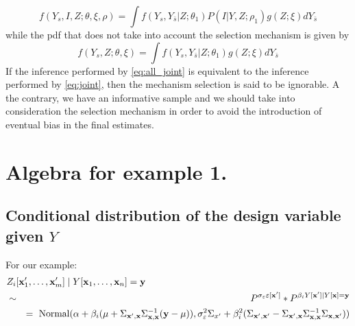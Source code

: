 \documentclass[12pt]{article}
\theoremstyle{definition}
\theoremstyle{remark}
\newcommand{\paramnuisance}{\xi}
\newcommand{\provar}{\Sigma}
\newcommand{\position}{\mathbf{x}}
\newcommand{\Signal}{Y}
\newcommand{\signal}{\mathbf{y}}
\newcommand{\indicator}{I}
\newcommand{\Desvar}{Z}
\begin{document}
\begin{equation} \label{eq:all_joint}
    f\left(\Signal_{s},\indicator,\Desvar;\theta,\paramnuisance,\rho\right)=\int{f\left(\Signal_{s},\Signal_{\bar{s}}|\Desvar;\theta_{1}\right)P\left(\indicator|\Signal,\Desvar;\rho_{1}\right)g\left(\Desvar;\paramnuisance\right)d\Signal_{\bar{s}}}
\end{equation}
while the pdf that does not take into account the selection mechanism is given by
\begin{equation} \label{eq:joint}
    f\left(\Signal_{s},\Desvar;\theta,\paramnuisance\right)=\int{f\left(\Signal_{s},\Signal_{\bar{s}}|\Desvar;\theta_{1}\right)g\left(\Desvar;\paramnuisance\right)d\Signal_{\bar{s}}}
\end{equation}
If the inference performed by \eqref{eq:all_joint} is equivalent to the inference performed by \eqref{eq:joint}, then the mechanism selection is said to be ignorable. A the contrary, we have an informative sample and we should take into consideration the selection mechanism in order to avoid the introduction of eventual bias in the final estimates.




\appendix
\section{Algebra for example 1.}

\subsection{Conditional distribution of the design variable given $\Signal$}
For our example:
\begin{eqnarray*}
\lefteqn{\Desvar_i[\position'_{1},\ldots,\position'_{m}]\mid\Signal[\position_{1},\dots,\position_{n}]=
    \signal}\\&\sim&
   P^{\sigma_\varepsilon\varepsilon[\position']}
   \ast 
    P^{\beta_i\Signal[\position']\mid\Signal[\position]=
    \signal}\\&&=\ 
   \mathrm{Normal}(\alpha+\beta_i(\mu+\Sigma_{\position',\position}\Sigma_{\position,\position}^{-1} (\signal-\mu)),
\sigma_\varepsilon^2\provar_{x'}+\beta_i^2(\provar_{\position',\position'}-\provar_{\position',\position}\provar_{\position,\position}^{-1}\provar_{\position,\position'}))
    \end{eqnarray*}
\end{document}
